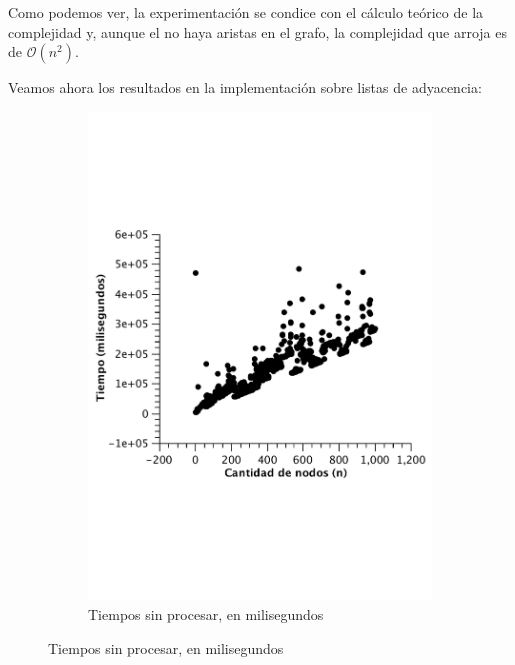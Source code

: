 Como podemos ver, la experimentación se condice con el cálculo teórico de la complejidad y, aunque el no haya aristas en el grafo, la complejidad que arroja es de $\mathcal{O}(n^2)$.


Veamos ahora los resultados en la implementación sobre listas de adyacencia:

\begin{figure}[H]
        \centering
\begin{subfigure}[b]{0.25\textwidth}
                \includegraphics[width=\textwidth]{imagenes/vacio-listas-1.pdf}
                \caption{Tiempos sin procesar, en milisegundos}
        \end{subfigure}%


\end{figure}
